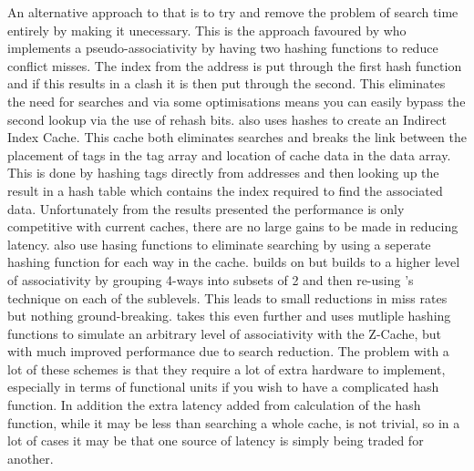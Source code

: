 An alternative approach to that is to try and remove the problem of search time entirely by making it unecessary. This is the approach favoured by \citet{agarwalColumnassociativeCachesTechnique1993} who implements a pseudo-associativity by having two hashing functions to reduce conflict misses. The index from the address is put through the first hash function and if this results in a clash it is then put through the second. This eliminates the need for searches and via some optimisations means you can easily bypass the second lookup via the use of rehash bits. \citet{hallnorFullyAssociativeSoftwaremanaged2000} also uses hashes to create an Indirect Index Cache. This cache both eliminates searches and breaks the link between the placement of tags in the tag array and location of cache data in the data array. This is done by hashing tags directly from addresses and then looking up the result in a hash table which contains the index required to find the associated data. Unfortunately from the results presented the performance is only competitive with current caches, there are no large gains to be made in reducing latency. \citeauthor{seznecSkewedassociativeCaches1993} \cite{seznecSkewedassociativeCaches1993, seznecCaseTwowaySkewedassociative1993, bodinSkewedAssociativityImproves1997} also use hasing functions to eliminate searching by using a seperate hashing function for each way in the cache. \citet{djordjalianMinimallyskewedassociativeCaches2002} builds on \citeauthor{seznecCaseTwowaySkewedassociative1993} but builds to a higher level of associativity by grouping 4-ways into subsets of 2 and then re-using \citeauthor{seznecCaseTwowaySkewedassociative1993}'s technique on each of the sublevels. This leads to small reductions in miss rates but nothing ground-breaking. \citet{sanchezZCacheDecouplingWays2010} takes this even further and uses mutliple hashing functions to simulate an arbitrary level of associativity with the Z-Cache, but with much improved performance due to search reduction. The problem with a lot of these schemes is that they require a lot of extra hardware to implement, especially in terms of functional units if you wish to have a complicated hash function. In addition the extra latency added from calculation of the hash function, while it may be less than searching a whole cache, is not trivial, so in a lot of cases it may be that one source of latency is simply being traded for another. 


